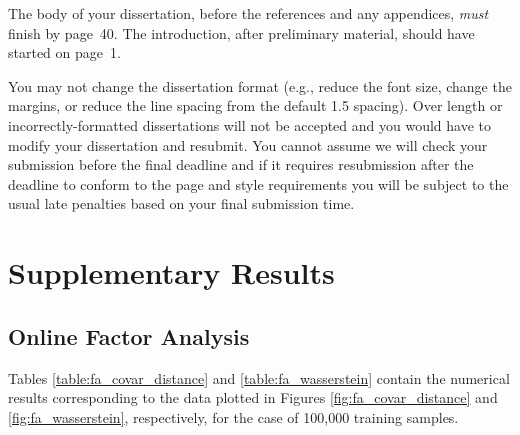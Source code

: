 \documentclass[msc,deptreport.inf]{infthesis} %
\begin{document}
The body of your dissertation, before the references and any appendices,
\emph{must} finish by page~40. The introduction, after preliminary material,
should have started on page~1.

You may not change the dissertation format (e.g., reduce the font
size, change the margins, or reduce the line spacing from the default
1.5 spacing). Over length or incorrectly-formatted dissertations will
not be accepted and you would have to modify your dissertation and
resubmit.  You cannot assume we will check your submission before the
final deadline and if it requires resubmission after the deadline to
conform to the page and style requirements you will be subject to the
usual late penalties based on your final submission time.




 \appendix

 \chapter{Supplementary Results}
 
 \section{Online Factor Analysis}
 
Tables \ref{table:fa_covar_distance} and \ref{table:fa_wasserstein} contain the numerical results corresponding to the data plotted in  Figures \ref{fig:fa_covar_distance} and \ref{fig:fa_wasserstein}, respectively, for the case of 100,000 training samples. 
 
\end{document}
